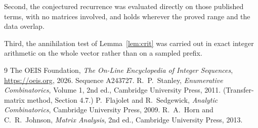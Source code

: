 \documentclass[11pt,a4paper]{article}
\theoremstyle{plain}
\theoremstyle{definition}
\begin{document}
Second, the conjectured recurrence was evaluated directly on those published terms, with no
matrices involved, and holds wherever the proved range and the data overlap.

Third, the annihilation test of Lemma~\ref{lem:crit} was carried out in exact integer
arithmetic on the whole vector rather than on a sampled prefix.

\begin{thebibliography}{9}
 The OEIS Foundation, \emph{The On-Line Encyclopedia of Integer
Sequences}, \url{https://oeis.org}, 2026. Sequence A243727.
 R.~P.~Stanley, \emph{Enumerative Combinatorics}, Volume 1, 2nd ed.,
Cambridge University Press, 2011. (Transfer-matrix method, Section 4.7.)
 P.~Flajolet and R.~Sedgewick, \emph{Analytic Combinatorics}, Cambridge
University Press, 2009.
 R.~A.~Horn and C.~R.~Johnson, \emph{Matrix Analysis}, 2nd ed., Cambridge
University Press, 2013.
\end{thebibliography}
\end{document}
